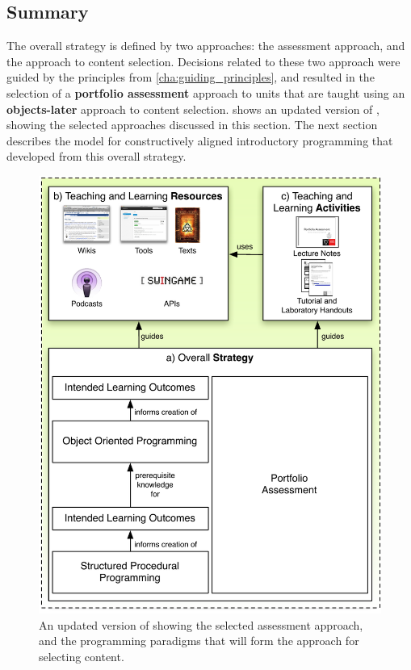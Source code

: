 
\subsection{Summary} %
\label{sub:summary}

The overall strategy is defined by two approaches: the assessment approach, and the approach to content selection. Decisions related to these two approach were guided by the principles from \cref{cha:guiding_principles}, and resulted in the selection of a \textbf{portfolio assessment} approach to units that are taught using an \textbf{objects-later} approach to content selection.  shows an updated version of , showing the selected approaches discussed in this section. The next section describes the model for constructively aligned introductory programming that developed from this overall strategy.

\begin{figure}[p]
	\centering
	\includegraphics[width=\textwidth]{OverallStrategy}
	\caption{An updated version of  showing the selected assessment approach, and the programming paradigms that will form the approach for selecting content.}
	\label{fig:overall_strategy}
\end{figure}

